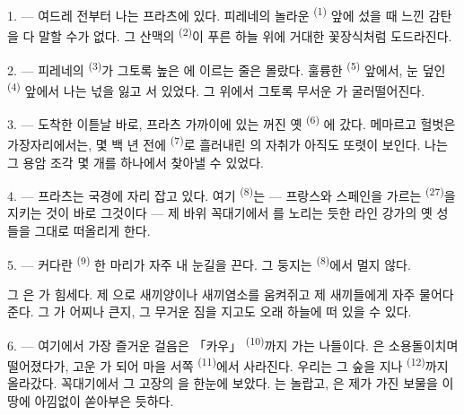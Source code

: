 \VUsaut{4.0mm}
\VUsaut{3.0mm}

\VUsaut{3.0mm}

\VUsaut{3.0mm}

1. --- 여드레 전부터 나는 프라츠에 있다. 피레네의 놀라운  \textsuperscript{(1)}
앞에 섰을 때 느낀 감탄을 다 말할 수가 없다. 그 산맥의  \textsuperscript{(2)}이
푸른 하늘 위에 거대한 꽃장식처럼 도드라진다.

2. --- 피레네의  \textsuperscript{(3)}가 그토록 높은 에 이르는
줄은 몰랐다. 훌륭한  \textsuperscript{(5)} 앞에서, 눈 덮인 
\textsuperscript{(4)} 앞에서 나는 넋을 잃고 서 있었다. 그 위에서 그토록 무서운
가 굴러떨어진다.

\VUsaut{3.0mm}
\VUsaut{3.0mm}

3. --- 도착한 이튿날 바로, 프라츠 가까이에 있는 꺼진 옛  \textsuperscript{(6)}
에 갔다. 메마르고 헐벗은  가장자리에서는, 몇 백 년 전에 
\textsuperscript{(7)}로 흘러내린 의 자취가 아직도 또렷이 보인다. 나는 그
용암 조각 몇 개를  하나에서 찾아낼 수 있었다.

4. --- 프라츠는 국경에 자리 잡고 있다. 여기  \textsuperscript{(8)}는 —
프랑스와 스페인을 가르는  \textsuperscript{(27)}을 지키는 것이 바로 그것이다
— 제 바위 꼭대기에서 를 노리는 듯한 라인 강가의 옛 성들을 그대로 떠올리게
한다.

5. --- 커다란  \textsuperscript{(9)} 한 마리가 자주 내 눈길을 끈다. 그
둥지는  \textsuperscript{(8)}에서 멀지 않다.

그 은 가 힘세다. 제 으로 새끼양이나 새끼염소를
움켜쥐고 제 새끼들에게 자주 물어다 준다. 그 가 어찌나 큰지, 그 무거운 짐을
지고도 오래 하늘에 떠 있을 수 있다.

\VUsaut{3.0mm}
\VUsaut{3.0mm}

6. --- 여기에서 가장 즐거운 걸음은 「카우」  \textsuperscript{(10)}까지 가는
나들이다. 은 소용돌이치며 떨어졌다가, 고운 가 되어
마을 서쪽  \textsuperscript{(11)}에서 사라진다. 우리는 그 숲을 지나
 \textsuperscript{(12)}까지 올라갔다.  꼭대기에서 그
고장의 을 한눈에 보았다. 는 놀랍고, 은 제가 가진
보물을 이 땅에 아낌없이 쏟아부은 듯하다.

